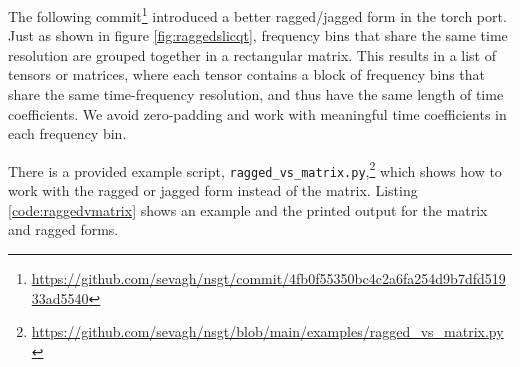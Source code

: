 \documentclass[report.tex]{subfiles}
\begin{document}
The following commit\footnote{\url{https://github.com/sevagh/nsgt/commit/4fb0f55350bc4c2a6fa254d9b7dfd51933ad5540}} introduced a better ragged/jagged form in the torch port. Just as shown in figure \ref{fig:raggedslicqt}, frequency bins that share the same time resolution are grouped together in a rectangular matrix. This results in a list of tensors or matrices, where each tensor contains a block of frequency bins that share the same time-frequency resolution, and thus have the same length of time coefficients. We avoid zero-padding and work with meaningful time coefficients in each frequency bin.

There is a provided example script, \Verb#ragged_vs_matrix.py#,\footnote{\url{https://github.com/sevagh/nsgt/blob/main/examples/ragged_vs_matrix.py}} which shows how to work with the ragged or jagged form instead of the matrix. Listing \ref{code:raggedvmatrix} shows an example and the printed output for the matrix and ragged forms.
\end{document}
